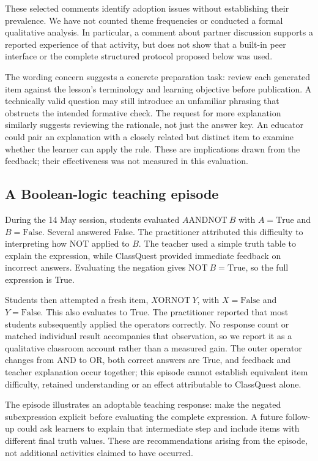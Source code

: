 These selected comments identify adoption issues without establishing their prevalence. We have not counted theme frequencies or conducted a formal qualitative analysis. In particular, a comment about partner discussion supports a reported experience of that activity, but does not show that a built-in peer interface or the complete structured protocol proposed below was used.

The wording concern suggests a concrete preparation task: review each generated item against the lesson's terminology and learning objective before publication. A technically valid question may still introduce an unfamiliar phrasing that obstructs the intended formative check. The request for more explanation similarly suggests reviewing the rationale, not just the answer key. An educator could pair an explanation with a closely related but distinct item to examine whether the learner can apply the rule. These are implications drawn from the feedback; their effectiveness was not measured in this evaluation.

\subsection{A Boolean-logic teaching episode}
During the 14 May session, students evaluated $A\mathbin{\mathrm{AND}}\mathrm{NOT}\ B$ with $A=\mathrm{True}$ and $B=\mathrm{False}$. Several answered False. The practitioner attributed this difficulty to interpreting how NOT applied to $B$. The teacher used a simple truth table to explain the expression, while ClassQuest provided immediate feedback on incorrect answers. Evaluating the negation gives $\mathrm{NOT}\ B=\mathrm{True}$, so the full expression is True.

Students then attempted a fresh item, $X\mathbin{\mathrm{OR}}\mathrm{NOT}\ Y$, with $X=\mathrm{False}$ and $Y=\mathrm{False}$. This also evaluates to True. The practitioner reported that most students subsequently applied the operators correctly. No response count or matched individual result accompanies that observation, so we report it as a qualitative classroom account rather than a measured gain. The outer operator changes from AND to OR, both correct answers are True, and feedback and teacher explanation occur together; this episode cannot establish equivalent item difficulty, retained understanding or an effect attributable to ClassQuest alone.

The episode illustrates an adoptable teaching response: make the negated subexpression explicit before evaluating the complete expression. A future follow-up could ask learners to explain that intermediate step and include items with different final truth values. These are recommendations arising from the episode, not additional activities claimed to have occurred.

